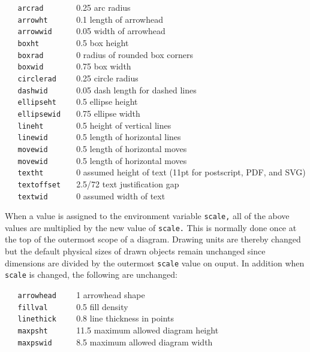 {\tt \ \ \ arcrad\ \ \ \ \ \ \ }
0.25   arc radius
\\\hbox{}\hskip-1pt
{\tt \ \ \ arrowht\ \ \ \ \ \ }
0.1    length of arrowhead
\\\hbox{}\hskip-1pt
{\tt \ \ \ arrowwid\ \ \ \ \ }
0.05   width of arrowhead
\\\hbox{}\hskip-1pt
{\tt \ \ \ boxht\ \ \ \ \ \ \ \ }
0.5    box height
\\\hbox{}\hskip-1pt
{\tt \ \ \ boxrad\ \ \ \ \ \ \ }
0      radius of rounded box corners
\\\hbox{}\hskip-1pt
{\tt \ \ \ boxwid\ \ \ \ \ \ \ }
0.75   box width
\\\hbox{}\hskip-1pt
{\tt \ \ \ circlerad\ \ \ \ }
0.25   circle radius
\\\hbox{}\hskip-1pt
{\tt \ \ \ dashwid\ \ \ \ \ \ }
0.05   dash length for dashed lines
\\\hbox{}\hskip-1pt
{\tt \ \ \ ellipseht\ \ \ \ }
0.5    ellipse height
\\\hbox{}\hskip-1pt
{\tt \ \ \ ellipsewid\ \ \ }
0.75   ellipse width
\\\hbox{}\hskip-1pt
{\tt \ \ \ lineht\ \ \ \ \ \ \ }
0.5    height of vertical lines
\\\hbox{}\hskip-1pt
{\tt \ \ \ linewid\ \ \ \ \ \ }
0.5    length of horizontal lines
\\\hbox{}\hskip-1pt
{\tt \ \ \ movewid\ \ \ \ \ \ }
0.5    length of horizontal moves
\\\hbox{}\hskip-1pt
{\tt \ \ \ movewid\ \ \ \ \ \ }
0.5    length of horizontal moves
\\\hbox{}\hskip-1pt
{\tt \ \ \ textht\ \ \ \ \ \ \ }
0      assumed height of text (11pt for postscript, PDF, and SVG)
\\\hbox{}\hskip-1pt
{\tt \ \ \ textoffset\ \ \ }
2.5/72 text justification gap
\\\hbox{}\hskip-1pt
{\tt \ \ \ textwid\ \ \ \ \ \ }
0      assumed width of text

When a value is assigned to the environment variable
{\tt scale,}
all of the above values are multiplied by the new value of
{\tt scale.}
This is normally done once at the top of the outermost scope of a diagram.
Drawing units are thereby changed but the default physical sizes of
drawn objects remain unchanged since dimensions are divided by the outermost
{\tt scale}
value on ouput.
In addition when
{\tt scale}
is changed, the following are unchanged:

{\tt \ \ \ arrowhead\ \ \ \ }
1      arrowhead shape
\\\hbox{}\hskip-1pt
{\tt \ \ \ fillval\ \ \ \ \ \ }
0.5    fill density
\\\hbox{}\hskip-1pt
{\tt \ \ \ linethick\ \ \ \ }
0.8    line thickness in points
\\\hbox{}\hskip-1pt
{\tt \ \ \ maxpsht\ \ \ \ \ \ }
11.5   maximum allowed diagram height
\\\hbox{}\hskip-1pt
{\tt \ \ \ maxpswid\ \ \ \ \ }
8.5    maximum allowed diagram width

